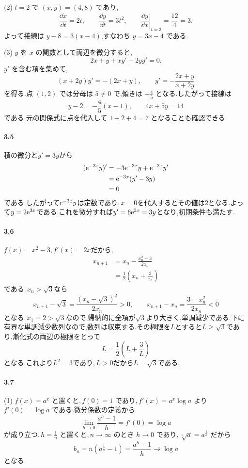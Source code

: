 (2) $t=2$ で $(x,y)=(4,8)$ であり,
\[
 \frac{\dd x}{\dd t}=2t,\qquad
 \frac{\dd y}{\dd t}=3t^2,\qquad
 \left.\frac{\dd y}{\dd x}\right|_{t=2}
 =\frac{12}{4}=3.
\]
よって接線は $y-8=3(x-4)$,すなわち $y=3x-4$ である.

(3) $y$ を $x$ の関数として両辺を微分すると,
\[
 2x+y+xy'+2yy'=0.
\]
$y'$ を含む項を集めて,
\[
 (x+2y)y'=-(2x+y),\qquad
 y'=-\frac{2x+y}{x+2y}
\]
を得る.点 $(1,2)$ では分母は $5\ne0$ で,傾きは $-\frac45$ となる.したがって接線は
\[
 y-2=-\frac45(x-1),\qquad 4x+5y=14
\]
である.元の関係式に点を代入して $1+2+4=7$ となることも確認できる.

\paragraph{3.5}
積の微分と$y'=3y$から
\begin{align*}
 (\mathrm{e}^{-3x}y)'&=-3\mathrm{e}^{-3x}y+\mathrm{e}^{-3x}y'\\
 &=\mathrm{e}^{-3x}(y'-3y)\\
 &=0
\end{align*}
である.したがって$\mathrm{e}^{-3x}y$は定数であり,\,$x=0$を代入するとその値は$2$となる.よって$y=2\mathrm{e}^{3x}$である.これを微分すれば$y'=6\mathrm{e}^{3x}=3y$となり,初期条件も満たす.
\paragraph{3.6}
$f(x)=x^2-3$,\,$f'(x)=2x$だから,
\begin{align*}
 x_{n+1}&=x_n-\frac{x_n^2-3}{2x_n}\\
 &=\frac12\left(x_n+\frac3{x_n}\right)
\end{align*}
である.\,$x_n>\sqrt3$なら
\[
 x_{n+1}-\sqrt3=\frac{(x_n-\sqrt3)^2}{2x_n}>0,
 \qquad x_{n+1}-x_n=\frac{3-x_n^2}{2x_n}<0
\]
となる.\,$x_1=2>\sqrt3$なので,帰納的に全項が$\sqrt3$より大きく,単調減少である.下に有界な単調減少数列なので,数列は収束する.その極限を$L$とすると$L\ge\sqrt3$であり,漸化式の両辺の極限をとって
\[
 L=\frac12\left(L+\frac3L\right)
\]
となる.これより$L^2=3$であり,\,$L>0$だから$L=\sqrt3$である.

\paragraph{3.7}
(1) $f(x)=a^x$ と置くと,\,$f(0)=1$ であり,\,$f'(x)=a^x\log a$ より $f'(0)=\log a$ である.微分係数の定義から
\[
 \lim_{h\to0}\frac{a^h-1}{h}=f'(0)=\log a
\]
が成り立つ.\,$h=\frac1n$ と置くと,\,$n\to\infty$ のとき $h\to0$ であり,\,$\sqrt[n]{a}=a^{\frac1n}$ だから
\[
 b_n=n\left(a^{\frac1n}-1\right)=\frac{a^h-1}{h}\longrightarrow\log a
\]
となる.

